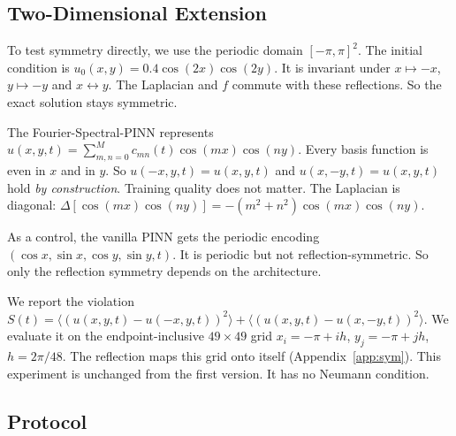 

\subsection{Two-Dimensional Extension}\label{sec:2d}

To test symmetry directly, we use the periodic domain $[-\pi,\pi]^2$. The initial condition is $u_0(x,y)=0.4\cos(2x)\cos(2y)$. It is invariant under $x\mapsto-x$, $y\mapsto-y$ and $x\leftrightarrow y$. The Laplacian and $f$ commute with these reflections. So the exact solution stays symmetric.

The Fourier-Spectral-PINN represents $u(x,y,t)=\sum_{m,n=0}^{M}c_{mn}(t)\cos(mx)\cos(ny)$. Every basis function is even in $x$ and in $y$. So $u(-x,y,t)=u(x,y,t)$ and $u(x,-y,t)=u(x,y,t)$ hold \emph{by construction}. Training quality does not matter. The Laplacian is diagonal: $\Delta[\cos(mx)\cos(ny)]=-(m^2+n^2)\cos(mx)\cos(ny)$.

As a control, the vanilla PINN gets the periodic encoding $(\cos x,\sin x,\cos y,\sin y,t)$. It is periodic but not reflection-symmetric. So only the reflection symmetry depends on the architecture.

We report the violation $S(t)=\langle(u(x,y,t)-u(-x,y,t))^2\rangle+\langle(u(x,y,t)-u(x,-y,t))^2\rangle$. We evaluate it on the endpoint-inclusive $49\times49$ grid $x_i=-\pi+ih$, $y_j=-\pi+jh$, $h=2\pi/48$. The reflection maps this grid onto itself (Appendix~\ref{app:sym}). This experiment is unchanged from the first version. It has no Neumann condition.

\subsection{Protocol}\label{sec:protocol}

